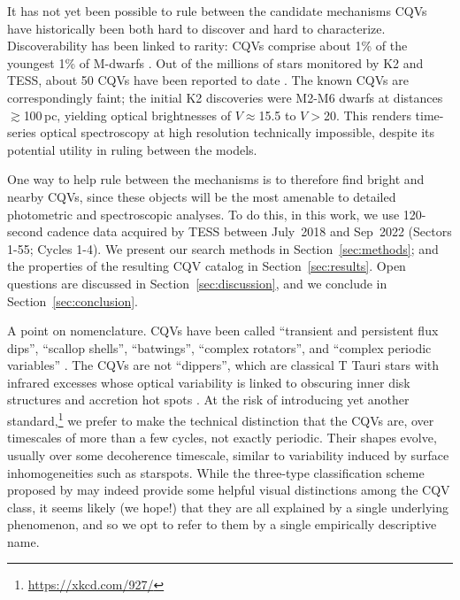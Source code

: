 \documentclass[11pt,twocolumn,tighten]{aastex63}
\begin{document}
It has not yet been possible to rule between the candidate mechanisms
CQVs have historically been both hard to discover and hard to
characterize.   Discoverability has been linked to rarity: CQVs
comprise about 1\% of the youngest 1\% of M-dwarfs
\citep{2018AJ....155..196R}.  Out of the millions of stars monitored
by K2 and TESS, about 50 CQVs have been reported to date
\citep{2016AJ....152..114R,2017AJ....153..152S,2018AJ....155...63S,2019ApJ...876..127Z,2020AJ....160...86B,2022AJ....163..144G,2023ApJ...945..114P}.
The known CQVs are correspondingly faint; the initial K2 discoveries
\citep{2016AJ....152..114R,2017AJ....153..152S} were M2-M6 dwarfs at distances
$\gtrsim$100\,pc, yielding optical brightnesses of $V$$\approx$15.5 to
$V$$>$20.  This renders time-series optical spectroscopy at high
resolution technically impossible, despite its potential utility in
ruling between the models.

One way to help rule between the mechanisms is to therefore find
bright and nearby CQVs, since these objects will be the most amenable
to detailed photometric and spectroscopic analyses.  To do this, in
this work, we use 120-second cadence data acquired by TESS between
July~2018 and Sep~2022 (Sectors 1-55; Cycles 1-4).  We present our
search methods in Section~\ref{sec:methods}; and the properties of the
resulting CQV catalog in Section~\ref{sec:results}.  Open questions
are discussed in Section~\ref{sec:discussion}, and we conclude in
Section~\ref{sec:conclusion}.

A point on nomenclature.  CQVs have been called ``transient and
persistent flux dips'', ``scallop shells'', ``batwings'',
\citep{2017AJ....153..152S,2018AJ....155...63S} ``complex rotators'',
\citep{2019ApJ...876..127Z,2022AJ....163..144G,2023ApJ...945..114P}
and ``complex periodic variables'' \citep{2023MNRAS.518.2921K}.  The
CQVs are not ``dippers'', which are classical T Tauri stars with
infrared excesses whose optical variability is linked to obscuring
inner disk structures and accretion hot spots
\citep{2014AJ....147...82C,2021ApJ...908...16R}.  At the risk of
introducing yet another
standard,\footnote{\url{https://xkcd.com/927/}} we prefer to make the
technical distinction that the CQVs are, over timescales of more than
a few cycles, not exactly periodic.  Their shapes evolve, usually over
some decoherence timescale, similar to variability induced by surface
inhomogeneities such as starspots.  While the three-type
classification scheme proposed by \citet{2017AJ....153..152S} may
indeed provide some helpful visual distinctions among the CQV class,
it seems likely (we hope!) that they are all explained by a single
underlying phenomenon, and so we opt to refer to them by a single
empirically descriptive name.
\end{document}

